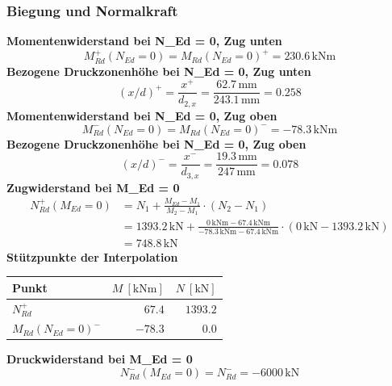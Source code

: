 \documentclass[11pt,a4paper]{article}
\begin{document}
\subsubsection{Biegung und Normalkraft}
\noindent\textbf{Momentenwiderstand bei N\_Ed = 0, Zug unten}
\begin{equation*}
M_{Rd}^{+}(N_{Ed} = 0) = M_{Rd}(N_{Ed}=0)^{+} = 230.6\,\mathrm{kNm}
\end{equation*}
\noindent\textbf{Bezogene Druckzonenhöhe bei N\_Ed = 0, Zug unten}
\begin{equation*}
\left(x/d\right)^{+} = \frac{x^{+}}{d_{2,x}} = \frac{62.7\,\mathrm{mm}}{243.1\,\mathrm{mm}} = 0.258
\end{equation*}
\noindent\textbf{Momentenwiderstand bei N\_Ed = 0, Zug oben}
\begin{equation*}
M_{Rd}^{-}(N_{Ed} = 0) = M_{Rd}(N_{Ed}=0)^{-} = -78.3\,\mathrm{kNm}
\end{equation*}
\noindent\textbf{Bezogene Druckzonenhöhe bei N\_Ed = 0, Zug oben}
\begin{equation*}
\left(x/d\right)^{-} = \frac{x^{-}}{d_{3,x}} = \frac{19.3\,\mathrm{mm}}{247\,\mathrm{mm}} = 0.078
\end{equation*}
\noindent\textbf{Zugwiderstand bei M\_Ed = 0}
\begin{equation*}
\begin{aligned}
  N_{Rd}^{+}(M_{Ed} = 0) &= N_1 + \frac{M_{Ed} - M_1}{M_2 - M_1} \cdot \left(N_2 - N_1\right) \\
  &= 1393.2\,\mathrm{kN} + \frac{0\,\mathrm{kNm} - 67.4\,\mathrm{kNm}}{-78.3\,\mathrm{kNm} - 67.4\,\mathrm{kNm}} \cdot \left(0\,\mathrm{kN} - 1393.2\,\mathrm{kN}\right) \\
  &= 748.8\,\mathrm{kN}
\end{aligned}
\end{equation*}
\noindent\textbf{Stützpunkte der Interpolation}
\begin{longtable}{lrr}
\hline
Punkt & $M\ [\mathrm{kNm}]$ & $N\ [\mathrm{kN}]$ \\
\hline
\endhead
$N_{Rd}^{+}$ & $67.4$ & $1393.2$ \\
$M_{Rd}(N_{Ed}=0)^{-}$ & $-78.3$ & $0.0$ \\
\hline
\end{longtable}
\noindent\textbf{Druckwiderstand bei M\_Ed = 0}
\begin{equation*}
N_{Rd}^{-}(M_{Ed} = 0) = N_{Rd}^{-} = -6000\,\mathrm{kN}
\end{equation*}
\end{document}
